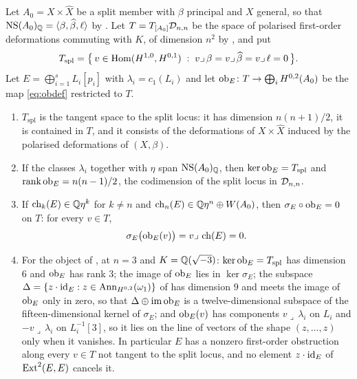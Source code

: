 \begin{proposition}
\label{prop:splitobstruction}
Let $A_{0}=X\times\widehat X$ be a split member with $\beta$ principal and
$X$ general, so that $\mathrm{NS}(A_{0})_{\mathbb{Q}}=\langle\beta,\widehat\beta,\ell\rangle$
by \cite[Proposition~15.19(iv)]{paperI}. Let $T=T_{[A_{0}]}\mathcal{D}_{n,n}$ be the space of
polarised first-order deformations commuting with $K$, of dimension $n^{2}$
by \cite[Proposition~9.14]{paperI}, and put
\[
  T_{\mathrm{spl}}
  =\bigl\{\,v\in\operatorname{Hom}(H^{1,0},H^{0,1})\;:\;
    v\lrcorner\,\beta=v\lrcorner\,\widehat\beta=v\lrcorner\,\ell=0\,\bigr\}.
\]
Let $E=\bigoplus_{i=1}^{s}L_{i}[p_{i}]$ with $\lambda_{i}=c_{1}(L_{i})$ and
let $\operatorname{ob}_{E}\colon T\to\bigoplus_{i}H^{0,2}(A_{0})$ be the map
\eqref{eq:obdef} restricted to $T$.
\begin{enumerate}[label=\textup{(\roman*)},nosep]
\item $T_{\mathrm{spl}}$ is the tangent space to the split locus: it has
  dimension $n(n+1)/2$, it is contained in $T$, and it consists of the
  deformations of $X\times\widehat X$ induced by the polarised deformations
  of $(X,\beta)$.
\item If the classes $\lambda_{i}$ together with $\eta$ span
  $\mathrm{NS}(A_{0})_{\mathbb{Q}}$, then $\ker\operatorname{ob}_{E}=T_{\mathrm{spl}}$ and
  $\operatorname{rank}\operatorname{ob}_{E}=n(n-1)/2$, the codimension of the split locus
  in $\mathcal{D}_{n,n}$.
\item If $\operatorname{ch}_{k}(E)\in\mathbb{Q}\eta^{k}$ for $k\ne n$ and
  $\operatorname{ch}_{n}(E)\in\mathbb{Q}\eta^{n}\oplus W(A_{0})$, then
  $\sigma_{E}\circ\operatorname{ob}_{E}=0$ on $T$: for every $v\in T$,
  \begin{equation}\label{eq:sigmaob}
    \sigma_{E}\bigl(\operatorname{ob}_{E}(v)\bigr)=v\lrcorner\,\operatorname{ch}(E)=0 .
  \end{equation}
\item For the object of , at $n=3$ and
  $K=\mathbb{Q}(\sqrt{-3})$: $\ker\operatorname{ob}_{E}=T_{\mathrm{spl}}$ has dimension $6$ and
  $\operatorname{ob}_{E}$ has rank $3$; the image of $\operatorname{ob}_{E}$ lies in $\ker\sigma_{E}$;
  the subspace $\Delta=\{z\cdot\operatorname{id}_{E}:z\in\operatorname{Ann}_{H^{0,2}}(\omega_{1})\}$ of
  \cite[Corollary~9.18]{paperI} has dimension $9$ and meets the image of $\operatorname{ob}_{E}$
  only in zero, so that $\Delta\oplus\operatorname{im}\operatorname{ob}_{E}$ is a twelve-dimensional
  subspace of the fifteen-dimensional kernel of $\sigma_{E}$; and
  $\operatorname{ob}_{E}(v)$ has components $v\lrcorner\,\lambda_{i}$ on $L_{i}$ and
  $-v\lrcorner\,\lambda_{i}$ on $L_{i}^{-1}[3]$, so it lies on the line of
  vectors of the shape $(z,\dots,z)$ only when it vanishes. In particular
  $E$ has a nonzero first-order obstruction along every $v\in T$ not tangent
  to the split locus, and no element $z\cdot\operatorname{id}_{E}$ of $\operatorname{Ext}^{2}(E,E)$
  cancels it.
\end{enumerate}
\end{proposition}

